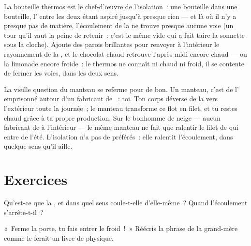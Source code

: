 \begin{example}[Le thermos]\label{ex:g5:heat-and-insulation:thermos}
La bouteille thermos est le chef-d'œuvre de l'isolation~: une
bouteille dans une bouteille, l' entre les deux étant aspiré
jusqu'à presque rien --- et là où il n'y a presque pas de matière,
l'écoulement de la  ne trouve presque aucune voie (un tour
qu'il vaut la peine de retenir~: c'est le même vide qui a fait taire
la sonnette sous la cloche). Ajoute des parois brillantes pour
renvoyer à l'intérieur le rayonnement de la , et le chocolat
chaud retrouve l'après-midi encore chaud --- ou la limonade encore
froide~: le thermos ne connaît ni chaud ni froid, il se contente de
fermer les voies, dans les deux sens.
\end{example}

\begin{remark}\label{rem:g5:heat-and-insulation:coat}
La vieille question du manteau se referme pour de bon. Un manteau,
c'est de l' emprisonné autour d'un fabricant de ~: toi. Ton
corps déverse de la  vers l'extérieur toute la journée~; le
manteau transforme ce flot en filet, et tu restes chaud grâce à ta
propre production. Sur le bonhomme de neige --- aucun fabricant de
 à l'intérieur --- le même manteau ne fait que ralentir le
filet de  qui entre de l'été. L'isolation n'a pas de
préférés~: elle ralentit l'écoulement, dans quelque sens qu'il aille.
\end{remark}

\section{Exercices}

\begin{exercise}[$\star$]\label{exo:g5:heat-and-insulation:1}
Qu'est-ce que la , et dans quel sens coule-t-elle d'elle-même~?
Quand l'écoulement s'arrête-t-il~?
\end{exercise}

\begin{exercise}[$\star$]\label{exo:g5:heat-and-insulation:2}
«~Ferme la porte, tu fais entrer le froid~!~» Réécris la phrase de
la grand-mère comme le ferait un livre de physique.
\end{exercise}

